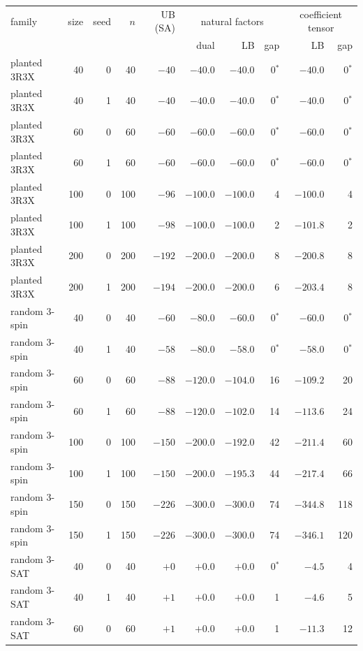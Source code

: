 \begin{tabular}{lrrr r rrr rr}
\toprule
family & size & seed & $n$ & UB (SA) & \multicolumn{3}{c}{natural factors} & \multicolumn{2}{c}{coefficient tensor} \\
& & & & & dual & LB & gap & LB & gap \\
\midrule
planted 3R3X & 40 & 0 & 40 & $-40$ & $-40.0$ & $-40.0$ & 0$^*$ & $-40.0$ & 0$^*$ \\
planted 3R3X & 40 & 1 & 40 & $-40$ & $-40.0$ & $-40.0$ & 0$^*$ & $-40.0$ & 0$^*$ \\
planted 3R3X & 60 & 0 & 60 & $-60$ & $-60.0$ & $-60.0$ & 0$^*$ & $-60.0$ & 0$^*$ \\
planted 3R3X & 60 & 1 & 60 & $-60$ & $-60.0$ & $-60.0$ & 0$^*$ & $-60.0$ & 0$^*$ \\
planted 3R3X & 100 & 0 & 100 & $-96$ & $-100.0$ & $-100.0$ & 4 & $-100.0$ & 4 \\
planted 3R3X & 100 & 1 & 100 & $-98$ & $-100.0$ & $-100.0$ & 2 & $-101.8$ & 2 \\
planted 3R3X & 200 & 0 & 200 & $-192$ & $-200.0$ & $-200.0$ & 8 & $-200.8$ & 8 \\
planted 3R3X & 200 & 1 & 200 & $-194$ & $-200.0$ & $-200.0$ & 6 & $-203.4$ & 8 \\
random 3-spin & 40 & 0 & 40 & $-60$ & $-80.0$ & $-60.0$ & 0$^*$ & $-60.0$ & 0$^*$ \\
random 3-spin & 40 & 1 & 40 & $-58$ & $-80.0$ & $-58.0$ & 0$^*$ & $-58.0$ & 0$^*$ \\
random 3-spin & 60 & 0 & 60 & $-88$ & $-120.0$ & $-104.0$ & 16 & $-109.2$ & 20 \\
random 3-spin & 60 & 1 & 60 & $-88$ & $-120.0$ & $-102.0$ & 14 & $-113.6$ & 24 \\
random 3-spin & 100 & 0 & 100 & $-150$ & $-200.0$ & $-192.0$ & 42 & $-211.4$ & 60 \\
random 3-spin & 100 & 1 & 100 & $-150$ & $-200.0$ & $-195.3$ & 44 & $-217.4$ & 66 \\
random 3-spin & 150 & 0 & 150 & $-226$ & $-300.0$ & $-300.0$ & 74 & $-344.8$ & 118 \\
random 3-spin & 150 & 1 & 150 & $-226$ & $-300.0$ & $-300.0$ & 74 & $-346.1$ & 120 \\
random 3-SAT & 40 & 0 & 40 & $+0$ & $+0.0$ & $+0.0$ & 0$^*$ & $-4.5$ & 4 \\
random 3-SAT & 40 & 1 & 40 & $+1$ & $+0.0$ & $+0.0$ & 1 & $-4.6$ & 5 \\
random 3-SAT & 60 & 0 & 60 & $+1$ & $+0.0$ & $+0.0$ & 1 & $-11.3$ & 12 \\

\end{tabular}
